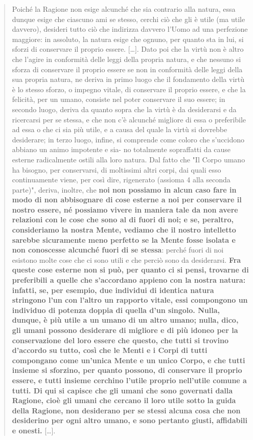 \begin{quotation}
	\small Poiché la Ragione non esige alcunché che sia contrario alla natura, essa dunque esige che ciascuno ami se stesso, cerchi ciò che gli è utile (ma utile davvero), desideri tutto ciò che
	indirizza davvero l’Uomo ad una perfezione maggiore: in assoluto, la natura esige che
	ognuno, per quanto sta in lui, si sforzi di conservare il proprio essere. [\dots]. Dato
	poi che la virtù non è altro che l’agire in conformità delle leggi della propria natura, e che
	nessuno si sforza di conservare il proprio essere se non in conformità delle leggi della sua
	propria natura, ne deriva in primo luogo che il fondamento della virtù è lo stesso sforzo, o
	impegno vitale, di conservare il proprio essere, e che la felicità, per un umano, consiste nel
	poter conservare il suo essere; in secondo luogo, deriva da quanto sopra che la virtù è da
	desiderarsi e da ricercarsi per se stessa, e che non c’è alcunché migliore di essa o preferibile ad essa o che ci sia più utile, e a causa del quale la virtù si dovrebbe desiderare; in terzo
	luogo, infine, si comprende come coloro che s’uccidono abbiano un animo impotente e sia-
	no totalmente sopraffatti da cause esterne radicalmente ostili alla loro natura. Dal fatto che "Il Corpo umano ha bisogno, per conservarsi, di moltissimi altri corpi, dai quali esso
	continuamente viene, per così dire, rigenerato (assioma 4 alla seconda parte)", deriva, inoltre, che \textbf{noi non possiamo in alcun caso fare in modo di
		non abbisognare di cose esterne a noi per conservare il nostro essere, né possiamo vivere in
		maniera tale da non avere relazioni con le cose che sono al di fuori di noi; e se, peraltro,
		consideriamo la nostra Mente, vediamo che il nostro intelletto sarebbe sicuramente meno
		perfetto se la Mente fosse isolata e non conoscesse alcunché fuori di se stessa}: perché fuori
	di noi esistono molte cose che ci sono utili e che perciò sono da desiderarsi. \textbf{Fra queste cose
		esterne non si può, per quanto ci si pensi, trovarne di preferibili a quelle che s’accordano
		appieno con la nostra natura: infatti, se, per esempio, due individui di identica natura
		stringono l’un con l’altro un rapporto vitale, essi compongono un individuo di potenza doppia di quella d’un singolo. Nulla, dunque, è più utile a un umano di un altro umano; nulla,
		dico, gli umani possono desiderare di migliore e di più idoneo per la conservazione del loro
		essere che questo, che tutti si trovino d’accordo su tutto, così che le Menti e i Corpi di tutti
		compongano come un’unica Mente e un unico Corpo, e che tutti insieme si sforzino, per
		quanto possono, di conservare il proprio essere, e tutti insieme cerchino l’utile proprio
		nell’utile comune a tutti. Di qui si capisce che gli umani che sono governati dalla Ragione,
		cioè gli umani che cercano il loro utile sotto la guida della Ragione, non desiderano per se
		stessi alcuna cosa che non desiderino per ogni altro umano, e sono pertanto giusti, affidabili e onesti.} [\dots].
	

\end{quotation}
